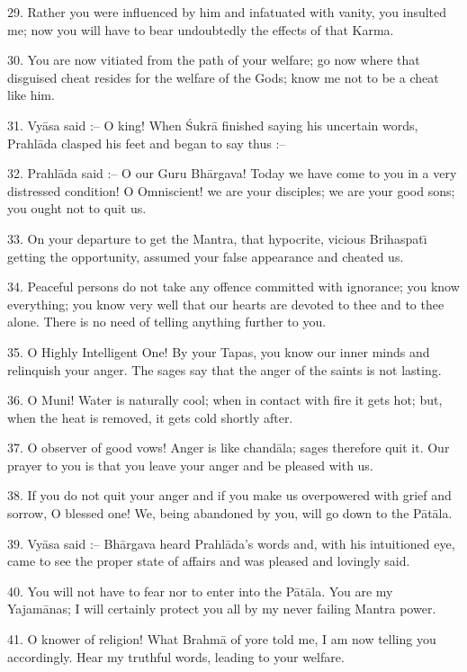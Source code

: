 29. Rather you were influenced by him and infatuated with vanity, you insulted me; now you will have to bear undoubtedly the effects of that Karma.

30. You are now vitiated from the path of your welfare; go now where that disguised cheat resides for the welfare of the Gods; know me not to be a cheat like him.

31. Vy\=asa said :-- O king! When \'Sukr\=a finished saying his uncertain words, Prahl\=ada clasped his feet and began to say thus :--

32. Prahl\=ada said :-- O our Guru Bh\=argava! Today we have come to you in a very distressed condition! O Omniscient! we are your disciples; we are your good sons; you ought not to quit us.

33. On your departure to get the Mantra, that hypocrite, vicious Brihaspat\={\i} getting the opportunity, assumed your false appearance and cheated us.

34. Peaceful persons do not take any offence committed with ignorance; you know everything; you know very well that our hearts are devoted to thee and to thee alone. There is no need of telling anything further to you.

35. O Highly Intelligent One! By your Tapas, you know our inner minds and relinquish your anger. The sages say that the anger of the saints is not lasting.

36. O Muni! Water is naturally cool; when in contact with fire it gets hot; but, when the heat is removed, it gets cold shortly after.

37. O observer of good vows! Anger is like chand\=ala; sages therefore quit it. Our prayer to you is that you leave your anger and be pleased with us.

38. If you do not quit your anger and if you make us overpowered with grief and sorrow, O blessed one! We, being abandoned by you, will go down to the P\=at\=ala.

39. Vy\=asa said :-- Bh\=argava heard Prahl\=ada's words and, with his intuitioned eye, came to see the proper state of affairs and was pleased and lovingly said.

40. You will not have to fear nor to enter into the P\=at\=ala. You are my Yajam\=anas; I will certainly protect you all by my never failing Mantra power.

41. O knower of religion! What Brahm\=a of yore told me, I am now telling you accordingly. Hear my truthful words, leading to your welfare.

